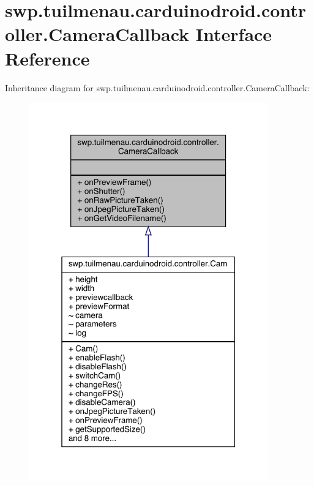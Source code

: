 \hypertarget{interfaceswp_1_1tuilmenau_1_1carduinodroid_1_1controller_1_1_camera_callback}{}\section{swp.\+tuilmenau.\+carduinodroid.\+controller.\+Camera\+Callback Interface Reference}
\label{interfaceswp_1_1tuilmenau_1_1carduinodroid_1_1controller_1_1_camera_callback}


Inheritance diagram for swp.\+tuilmenau.\+carduinodroid.\+controller.\+Camera\+Callback\+:
\nopagebreak
\begin{figure}[H]
\begin{center}
\leavevmode
\includegraphics[width=292pt]{interfaceswp_1_1tuilmenau_1_1carduinodroid_1_1controller_1_1_camera_callback__inherit__graph}
\end{center}
\end{figure}


